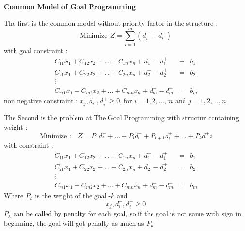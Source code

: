 \documentclass[twoside,twocolumn]{article}
\begin{document}
		\textbf{Common Model of Goal Programming}
		
		The first is the common model without priority factor in the structure :
		\begin{equation*}
		\text{Minimize}~~ Z = \displaystyle\sum_{i=1}^{m} \left(d^+_i + d^-_i\right)
		\end{equation*}
		with goal constraint :
		\begin{equation*}
		\begin{array}{rcl}
		C_{11}x_1+C_{12}x_2 + \dots + C_{1n}x_n + d^-_1 - d^+_1&=&b_1\\
		C_{21}x_1+C_{22}x_2 + \dots + C_{2n}x_n + d^-_2- d^+_2&=&b_2\\
		\vdots&&\\
		C_{m1}x_1+C_{m2}x_2 + \dots + C_{mn}x_n + d^-_m - d^+_m&=&b_m
		\end{array}
		\end{equation*}
		non negative constraint : $x_j,d^-_i,d^+_i \geq 0$, for $i = 1,2,\dots,m$ and $j = 1,2,\dots,n$
		
		\vspace{1cm}
		The Second is the problem at The Goal Programming with structur containing weight :
		\begin{equation*}
		\text{Minimize : }~~~ Z = P_1d^-_i + \dots + P_ld^-_i + P_{i+1}d^+_i +\dots + P_kd^+i
		\end{equation*}
		with constraint :
		\begin{equation*}
		\begin{array}{rcl}
		C_{11}x_1+C_{12}x_2 + \dots + C_{1n}x_n + d^-_1 - d^+_1&=&b_1\\
		C_{21}x_1+C_{22}x_2 + \dots + C_{2n}x_n + d^-_2- d^+_2&=&b_2\\
		\vdots&&\\
		C_{m1}x_1+C_{m2}x_2 + \dots + C_{mn}x_n + d^-_m - d^+_m&=&b_m
		\end{array}
		\end{equation*}
		Where $P_k$ is the weight of the goal -$k$
		and $$x_j,d^-_i,d^+_i \geq 0$$
		$P_k $ can be called by penalty for each goal, so if the goal is not same with sign in beginning, the goal will got penalty as much as $P_k$
\end{document}
